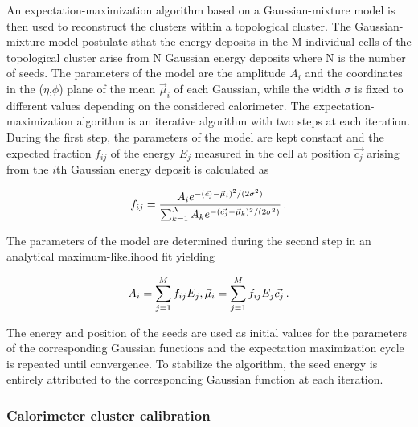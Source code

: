 An expectation-maximization algorithm based on a Gaussian-mixture model is then used to reconstruct the clusters within a topological cluster.  The Gaussian-mixture model postulate sthat the energy deposits in the M individual cells of the topological cluster arise from N Gaussian energy deposits where N is the number of seeds.  The parameters of the model are the amplitude $A_i$ and the coordinates in the ($\eta$,$\phi$) plane of the mean $\Vec{\mu}_i$ of each Gaussian, while the width $\sigma$ is fixed to different values depending on the considered calorimeter. The expectation-maximization algorithm is an iterative algorithm with two steps at each iteration.  During the first step, the parameters of the model are kept constant and the expected fraction $f_{ij}$ of the energy $E_j$ measured in the cell at position $\Vec{c_j}$ arising from the $i$th Gaussian energy deposit is calculated as

\begin{equation}
    f_{ij} = \frac{A_i e^{-(\Vec{c_j}-\Vec{\mu}_i)^2 / (2\sigma^2)}}{\sum_{k=1}^N A_k e^{-(\Vec{c_j}-\Vec{\mu}_k)^2 / (2\sigma^2)}} \mend
\end{equation}

The parameters of the model are determined during the second step in an analytical maximum-likelihood fit yielding

\begin{equation}
    A_i = \sum_{j=1}^M f_{ij}E_j , \Vec{\mu}_i = \sum_{j=1}^M f_{ij}E_j \Vec{c_j} \mend
\end{equation}

The energy and position of the seeds are used as initial values for the parameters of the corresponding Gaussian functions and the expectation maximization cycle is repeated until convergence.  To stabilize the algorithm, the seed energy is entirely attributed to the corresponding Gaussian function at each iteration.

\subsubsection{Calorimeter cluster calibration}

